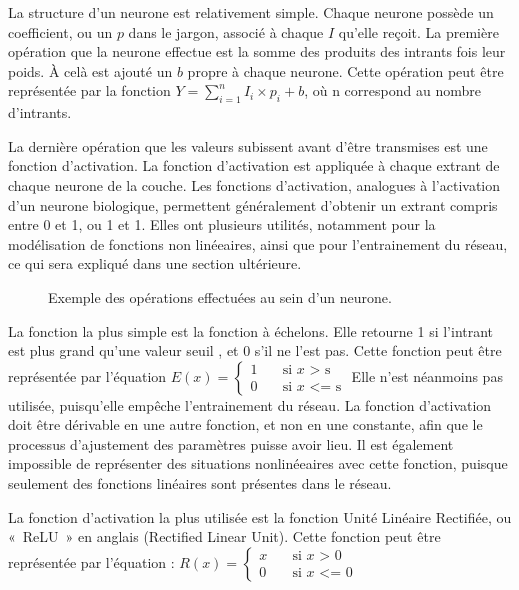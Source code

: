 \documentclass[letterpaper,10pt,french]{sphinxmanual}
\begin{document}
La structure d’un neurone est relativement simple. Chaque neurone possède un coefficient, ou un  \(p\) dans le jargon, associé à chaque  \(I\) qu’elle reçoit.
La première opération que la neurone effectue est la somme des produits des intrants fois leur poids. À celà est ajouté un  \(b\) propre à chaque neurone.
Cette opération peut être représentée par la fonction \(Y = \sum_{i=1}^{n} I_i \times p_i + b\), où n correspond au nombre d’intrants.

La dernière opération que les valeurs subissent avant d’être transmises est une fonction d’activation. La fonction d’activation est appliquée à chaque extrant de chaque
neurone de la couche. Les fonctions d’activation, analogues à l’activation
d’un neurone biologique, permettent généralement d’obtenir un extrant compris entre 0 et 1, ou \sphinxhyphen{}1 et 1. Elles ont plusieurs utilités, notamment
pour la modélisation de fonctions non linéeaires, ainsi que pour l’entrainement du réseau, ce qui sera expliqué dans une section ultérieure.

\begin{figure}[htbp]
\centering
\capstart

\noindent{}
\caption{Exemple des opérations effectuées au sein d’un neurone.}\label{\detokenize{notions_de_base:neurone}}\end{figure}

La fonction la plus simple est la fonction à échelons. Elle retourne 1 si l’intrant  est plus grand qu’une valeur seuil , et 0 s’il ne l’est pas. Cette fonction peut être représentée par l’équation
\(
E(x)=
\begin{cases}
 1 & \quad \text{si } x \text{ > s}\\
 0 & \quad \text{si } x \text{ <= s}
\end{cases}
\)
Elle n’est néanmoins pas utilisée, puisqu’elle empêche l’entrainement du réseau.
La fonction d’activation doit être dérivable en une autre fonction, et non en une constante, afin que le processus d’ajustement des paramètres puisse avoir lieu.
Il est également impossible de représenter des situations non\sphinxhyphen{}linéeaires avec cette fonction, puisque seulement des fonctions linéaires sont présentes dans le réseau.

La fonction d’activation la plus utilisée est la fonction Unité Linéaire Rectifiée, ou « ReLU » en anglais (Rectified Linear Unit).
Cette fonction peut être représentée par l’équation :  \(
R(x)=
\begin{cases}
 x & \quad \text{si } x \text{ > 0}\\
 0 & \quad \text{si } x \text{ <= 0}
\end{cases}
\)
\end{document}
